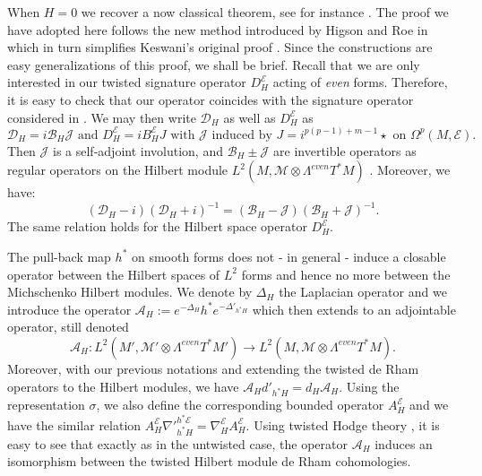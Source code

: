 \documentclass[12pt]{amsart}
\theoremstyle{plain}
\theoremstyle{definition}
\theoremstyle{remark}
\begin{document}
{When $H=0$ we recover a now classical theorem, see for instance \cite{Keswani}. The proof we have adopted here follows the new method introduced by Higson and Roe in \cite{HigsonRoeRho} which in turn simplifies  Keswani's original proof \cite{Keswani}. Since the constructions are easy generalizations of this proof, we shall be brief. Recall that we are only interested in  our twisted signature operator $D_H^{\mathcal E}$ acting of {\em{even} } forms. Therefore, it is easy to check that  our operator coincides with the signature operator considered in \cite{HigsonRoe1}. We may then write ${\mathcal D}_H$ as well as $D_H^{\mathcal E}$ as
$$
{\mathcal D}_H=i{\mathcal B}_H {\mathcal J} \text{ and } D_H^{\mathcal E} = i B^{\mathcal E}_H J\text{ with } {\mathcal J} \text{ induced by } J=i^{p(p-1)+m-1} \star \text{ on } \Omega^p (M,{\mathcal E}).
$$
Then ${\mathcal J}$ is a self-adjoint involution, and  ${\mathcal B}_H \pm {\mathcal J}$ are invertible operators as regular operators on the Hilbert module $L^2(M, {\mathcal M}\otimes \Lambda^{even}T^*M)$ \cite{Lance}. Moreover, we have: 
$$
({\mathcal D}_H - i)({\mathcal D}_H+i)^{-1} = ({\mathcal B}_H - {\mathcal J})({\mathcal B}_H+{\mathcal J})^{-1}.
$$
The same relation holds for the Hilbert space operator $D_H^{\mathcal E}$. 

The pull-back map $h^*$ on smooth forms does not - in general - induce a closable operator between the Hilbert spaces of $L^2$ forms and hence no more between the Michschenko Hilbert modules. We denote by $\Delta_H$ the Laplacian operator and we introduce  the operator ${\mathcal A}_H:=e^{-\Delta_H}  h^* e^{-\Delta'_{h^*H}}$ which then extends to an adjointable operator, still denoted 
$$
{\mathcal A}_H: L^2(M', {\mathcal M}'\otimes \Lambda^{even}T^*M') \longrightarrow L^2(M, {\mathcal M}\otimes \Lambda^{even}T^*M).
$$
Moreover, with our previous notations and extending the twisted de Rham operators to the Hilbert modules, we have  ${\mathcal A}_H d'_{h^*H} = d_H {\mathcal A}_H$. Using the representation $\sigma$, we also define the corresponding bounded operator $A_H^{\mathcal E}$ and we have the similar relation  $A_H^{\mathcal E} {\nabla'}_{h^*H}^{h^*{\mathcal E}} = \nabla_H^{\mathcal E} A_H^{\mathcal E}$. 
Using twisted Hodge theory \cite{MW}, it is easy to see that exactly as in the untwisted case, the operator ${\mathcal A}_H$ induces an isomorphism between the twisted Hilbert module de Rham cohomologies. 

}
\end{document}
